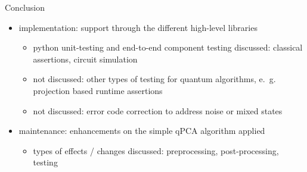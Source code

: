 \begin{frame}{Conclusion}
  \begin{minipage}{1.0\textwidth}
    \begin{itemize}
      \item implementation: support through the different high-level libraries
      \begin{itemize}
        \item python unit-testing and end-to-end component testing discussed: classical assertions, circuit simulation
        \item not discussed: other types of testing for quantum algorithms, e.~g. projection based runtime assertions
        \item not discussed: error code correction to address noise or mixed states
      \end{itemize}
      \item maintenance: enhancements on the simple qPCA algorithm applied
      \begin{itemize}
        \item types of effects / changes discussed: preprocessing, post-processing, testing
      \end{itemize}
    \end{itemize}
  \end{minipage}
\end{frame}
